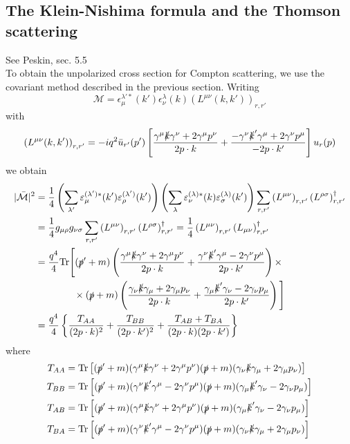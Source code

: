 \documentclass[TheoreticalPhy_ModB.tex]{subfiles}
\begin{document}
\subsection{The Klein-Nishima formula and the Thomson scattering}
\textsf{See Peskin, sec. 5.5}\\

To obtain the unpolarized cross section for Compton scattering, we use the covariant method described in the previous section. Writing
\[\mathcal M=\epsilon_\mu^{\lambda'*}(k')\epsilon_\nu^\lambda(k)\left(L^{\mu\nu}(k,k')\right)_{r,r'}\]
with 
\[\left(L^{\mu\nu}(k,k')\right)_{r,r'}=-iq^2\bar u_{r'}(p')\left[\frac{\gamma^\mu\slashed k\gamma^\nu+2\gamma^\mu p^\nu}{2p\cdot k}+\frac{-\gamma^\nu\slashed k'\gamma^\mu+2\gamma^\nu p^\mu}{-2p\cdot k'}\right]u_r(p)\]
we obtain
\begin{align*}
|\bar{\mathcal M}|^2&=\frac14\left(\sum_{\lambda'}\varepsilon_\mu^{(\lambda')*}(k')\varepsilon_\rho^{(\lambda')}(k')\right)\left(\sum_{\lambda}\varepsilon_\nu^{(\lambda)*}(k)\varepsilon_\sigma^{(\lambda)}(k')\right)\sum_{r,r'}\left(L^{\mu\nu}\right)_{r,r'}\left(L^{\rho\sigma}\right)^\dagger_{r,r'}\\
&=\frac14g_{\mu\rho}g_{\nu\sigma}\sum_{r,r'}\left(L^{\mu\nu}\right)_{r,r'}\left(L^{\rho\sigma}\right)^\dagger_{r,r'}
=\frac14\left(L^{\mu\nu}\right)_{r,r'}\left(L_{\mu\nu}\right)^\dagger_{r,r'}\\
&=\frac{q^4}4\textup{Tr}\Bigg[(\slashed p'+m)\left(\frac{\gamma^\mu\slashed k\gamma^\nu+2\gamma^\mu p^\nu}{2p\cdot k}+\frac{\gamma^\nu\slashed k'\gamma^\mu-2\gamma^\nu p^\mu}{2p\cdot k'}\right)\times\\
&\qquad\qquad\times(\slashed p+m)\left(\frac{\gamma_\nu\slashed k\gamma_\mu+2\gamma_\mu p_\nu}{2p\cdot k}+\frac{\gamma_\mu\slashed k'\gamma_\nu-2\gamma_\nu p_\mu}{2p\cdot k'}\right)\Bigg]\\
&=\frac{q^4}4\left\{\frac{T_{AA}}{(2p\cdot k)^2}+\frac{T_{BB}}{(2p\cdot k')^2}+\frac{T_{AB}+T_{BA}}{(2p\cdot k)(2p\cdot k')}\right\}
\end{align*}
where
\begin{align*}
T_{AA}&=\textup{Tr}\left[(\slashed p'+m)(\gamma^\mu\slashed k\gamma^\nu+2\gamma^\mu p^\nu)(\slashed p+m)(\gamma_\nu\slashed k\gamma_\mu+2\gamma_\mu p_\nu)\right]\\
T_{BB}&=\textup{Tr}\left[(\slashed p'+m)(\gamma^\nu\slashed k'\gamma^\mu-2\gamma^\nu p^\mu)(\slashed p+m)(\gamma_\mu\slashed k'\gamma_\nu-2\gamma_\nu p_\mu)\right]\\
T_{AB}&=\textup{Tr}\left[(\slashed p'+m)(\gamma^\mu\slashed k\gamma^\nu+2\gamma^\mu p^\nu)(\slashed p+m)(\gamma_\mu\slashed k'\gamma_\nu-2\gamma_\nu p_\mu)\right]\\
T_{BA}&=\textup{Tr}\left[(\slashed p'+m)(\gamma^\nu\slashed k'\gamma^\mu-2\gamma^\nu p^\mu)(\slashed p+m)(\gamma_\nu\slashed k\gamma_\mu+2\gamma_\mu p_\nu)\right]
\end{align*}
\end{document}
